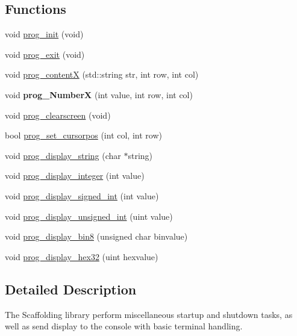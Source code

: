 \subsection*{Functions}
\begin{DoxyCompactItemize}
\item 
void \hyperlink{group__scaffolding_gadc1bdbe20a5b0bf20b786c454857af1a}{prog\+\_\+init} (void)
\item 
void \hyperlink{group__scaffolding_gae2602aec28da58d379b4136b455a62d7}{prog\+\_\+exit} (void)
\item 
void \hyperlink{group__scaffolding_gad26b68c9bc1df3aa990eb9f594e28760}{prog\+\_\+contentX} (std\+::string str, int row, int col)
\item 
\mbox{\label{group__scaffolding_gae8773733374b0af1000042f78b017d3d}} 
void {\bfseries prog\+\_\+\+NumberX} (int value, int row, int col)
\item 
void \hyperlink{group__scaffolding_ga4472335aeac8c96294ad2f77d875d2cd}{prog\+\_\+clearscreen} (void)
\item 
bool \hyperlink{group__scaffolding_ga0420c11494d215979edc5f657819a2ca}{prog\+\_\+set\+\_\+cursorpos} (int col, int row)
\item 
void \hyperlink{group__scaffolding_ga59bf0af8d61ca90c1825e3224b45eaf9}{prog\+\_\+display\+\_\+string} (char $\ast$string)
\item 
void \hyperlink{group__scaffolding_ga0ea4957bdb462cada821c4d728494087}{prog\+\_\+display\+\_\+integer} (int value)
\item 
void \hyperlink{group__scaffolding_gae0f19e55443d5e98d104d9bc8a0e96a9}{prog\+\_\+display\+\_\+signed\+\_\+int} (int value)
\item 
void \hyperlink{group__scaffolding_ga455086b694579da94041147474387a9b}{prog\+\_\+display\+\_\+unsigned\+\_\+int} (uint value)
\item 
void \hyperlink{group__scaffolding_ga00fa862c209364a485690c01cf67b281}{prog\+\_\+display\+\_\+bin8} (unsigned char binvalue)
\item 
void \hyperlink{group__scaffolding_gae22b0332268122b8ef7443b7bc5024b9}{prog\+\_\+display\+\_\+hex32} (uint hexvalue)
\end{DoxyCompactItemize}


\subsection{Detailed Description}
The Scaffolding library perform miscellaneous startup and shutdown tasks, as well as send display to the console with basic terminal handling. 

